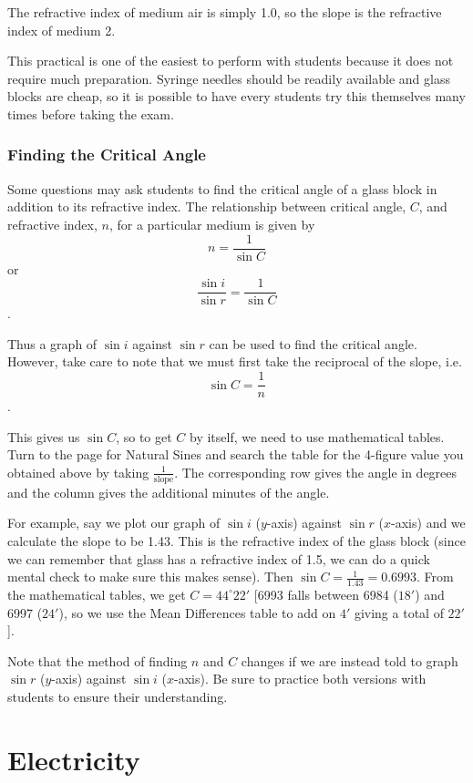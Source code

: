 The refractive index of medium air is simply 1.0, so the slope is the refractive index of
medium 2.

This practical is one of the easiest to perform with students because it does not
require much preparation. Syringe needles should be readily available and glass blocks are
cheap, so it is possible to have every students try this themselves many times before
taking the exam.

\subsubsection{Finding the Critical Angle} 
Some questions may ask students to find the critical angle of a glass block in addition to its refractive index. The relationship between critical angle, $C$, and refractive index, $n$, for a particular medium is given by 
$$n = \frac{1}{\sin{C}}$$ or $$\frac{\sin{i}}{\sin{r}} = \frac{1}{\sin{C}}$$.

Thus a graph of $\sin{i}$ against $\sin{r}$ can be used to find the critical angle. However, take care to note that we must first take the reciprocal of the slope, i.e.
$$\sin{C} = \frac{1}{n}$$.

This gives us $\sin{C}$, so to get $C$ by itself, we need to use mathematical tables. Turn to the page for Natural Sines and search the table for the 4-figure value you obtained above by taking $\frac{1}{\text{slope}}$. The corresponding row gives the angle in degrees and the column gives the additional minutes of the angle.

For example, say we plot our graph of $\sin{i}$ ($y$-axis) against $\sin{r}$ ($x$-axis) and we calculate the slope to be 1.43. This is the refractive index of the glass block (since we can remember that glass has a refractive index of 1.5, we can do a quick mental check to make sure this makes sense). Then $\sin{C} = \frac{1}{1.43} = 0.6993$. From the mathematical tables, we get $C = 44^\circ 22'$ [6993 falls between 6984 ($18'$) and 6997 ($24'$), so we use the Mean Differences table to add on $4'$ giving a total of $22'$].

Note that the method of finding $n$ and $C$ changes if we are instead told to graph $\sin{r}$ ($y$-axis) against $\sin{i}$ ($x$-axis). Be sure to practice both versions with students to ensure their understanding.

\section{Electricity}

